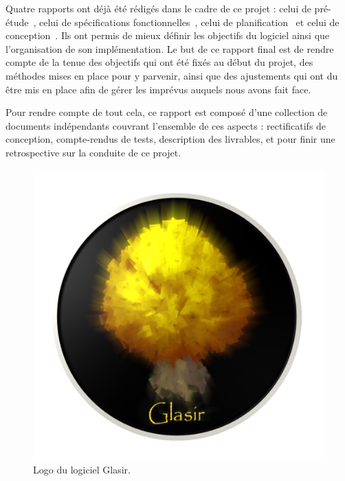 Quatre rapports ont déjà été rédigés dans le cadre de ce projet : celui de pré-étude~\cite{pre_etude}, celui de spécifications fonctionnelles~\cite{spec_fonc}, celui de planification~\cite{planif} et celui de conception~\cite{conception}. Ils ont permis de mieux définir les objectifs du logiciel ainsi que l'organisation de son implémentation. Le but de ce rapport final est de rendre compte de la tenue des objectifs qui ont été fixés au début du projet, des méthodes mises en place pour y parvenir, ainsi que des ajustements qui ont du être mis en place afin de gérer les imprévus auquels nous avons fait face. 

Pour rendre compte de tout cela, ce rapport est composé d'une collection de documents indépendants couvrant l'ensemble de ces aspects : rectificatifs de conception, compte-rendus de tests, description des livrables, et pour finir une retrospective sur la conduite de ce projet.

    \begin{figure}[H]
        \centering
        \includegraphics[height=0.5\textwidth]{figure/glasir.png}
        \caption{Logo du logiciel Glasir.}
        \label{fig:glasir}
    \end{figure}